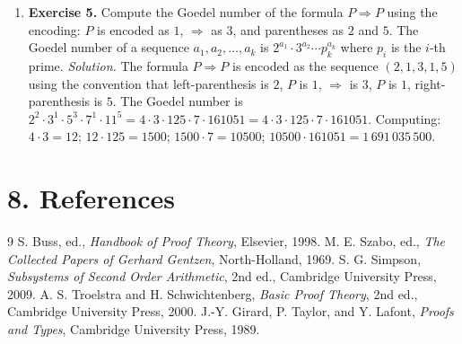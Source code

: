 \begin{enumerate}[leftmargin=*,itemsep=0.9em]
\item \textbf{Exercise 5.} Compute the Goedel number of the formula $P\Rightarrow P$ using the encoding: $P$ is encoded as $1$, $\Rightarrow$ as $3$, and parentheses as $2$ and $5$. The Goedel number of a sequence $a_1,a_2,\ldots,a_k$ is $2^{a_1}\cdot 3^{a_2}\cdots p_k^{a_k}$ where $p_i$ is the $i$-th prime. \emph{Solution.} The formula $P\Rightarrow P$ is encoded as the sequence $(2,1,3,1,5)$ using the convention that left-parenthesis is $2$, $P$ is $1$, $\Rightarrow$ is $3$, $P$ is $1$, right-parenthesis is $5$. The Goedel number is $2^2\cdot 3^1\cdot 5^3\cdot 7^1\cdot 11^5=4\cdot 3\cdot 125\cdot 7\cdot 161051=4\cdot 3\cdot 125\cdot 7\cdot 161051$. Computing: $4\cdot 3=12$; $12\cdot 125=1500$; $1500\cdot 7=10500$; $10500\cdot 161051=1\,691\,035\,500$.

\end{enumerate}
\section*{8. References}
\begin{thebibliography}{9}
 S. Buss, ed., \emph{Handbook of Proof Theory}, Elsevier, 1998.
 M. E. Szabo, ed., \emph{The Collected Papers of Gerhard Gentzen}, North-Holland, 1969.
 S. G. Simpson, \emph{Subsystems of Second Order Arithmetic}, 2nd ed., Cambridge University Press, 2009.
 A. S. Troelstra and H. Schwichtenberg, \emph{Basic Proof Theory}, 2nd ed., Cambridge University Press, 2000.
 J.-Y. Girard, P. Taylor, and Y. Lafont, \emph{Proofs and Types}, Cambridge University Press, 1989.
\end{thebibliography}
